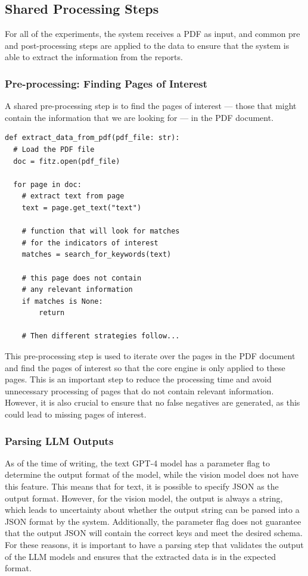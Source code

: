 \documentclass[english, 12pt, a4paper, elec, utf8, a-2b, online]{aaltothesis}
\begin{document}
\subsection{Shared Processing Steps}

For all of the experiments, the system receives a \ac{PDF} as input, and common pre and post-processing steps are applied to the data to ensure that the system is able to extract the information from the reports.

\subsubsection{Pre-processing: Finding Pages of Interest}

A shared pre-processing step is to find the pages of interest --- those that might contain the information that we are looking for --- in the \ac{PDF} document.

\begin{verbatim}
def extract_data_from_pdf(pdf_file: str):
  # Load the PDF file
  doc = fitz.open(pdf_file)

  for page in doc:
    # extract text from page
    text = page.get_text("text")

    # function that will look for matches
    # for the indicators of interest
    matches = search_for_keywords(text)

    # this page does not contain
    # any relevant information
    if matches is None:
        return

    # Then different strategies follow...
\end{verbatim}

This pre-processing step is used to iterate over the pages in the \ac{PDF} document and find the pages of interest so that the core engine is only applied to these pages.
This is an important step to reduce the processing time and avoid unnecessary processing of pages that do not contain relevant information.
However, it is also crucial to ensure that no false negatives are generated, as this could lead to missing pages of interest.

\subsubsection{Parsing LLM Outputs}

As of the time of writing, the text \ac{GPT}-4 model has a parameter flag to determine the output format of the model, while the vision model does not have this feature.
This means that for text, it is possible to specify \ac{JSON} as the output format.
However, for the vision model, the output is always a string, which leads to uncertainty about whether the output string can be parsed into a \ac{JSON} format by the system.
Additionally, the parameter flag does not guarantee that the output \ac{JSON} will contain the correct keys and meet the desired schema.
For these reasons, it is important to have a parsing step that validates the output of the \ac{LLM} models and ensures that the extracted data is in the expected format.
\end{document}
